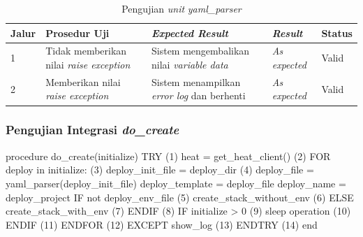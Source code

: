 \begin{longtable}{|P{.06\textwidth}|P{.30\textwidth}|P{.30\textwidth}|P{.10\textwidth}|P{.08\textwidth}|}
  \caption{Pengujian \emph{unit} \emph{yaml\_parser}} \label{jalur:yaml_parser} \\
  \hline
  \textbf{Jalur} & \textbf{Prosedur Uji} & \textbf{\emph{Expected Result}}
  & \textbf{\emph{Result}} & \textbf{Status} \\\hline
  1 & Tidak memberikan nilai \emph{raise exception} & Sistem mengembalikan nilai
                               \emph{variable data} & \emph{As expected} & Valid \\\hline
  2 & Memberikan nilai \emph{raise exception} & Sistem menampilkan \emph{error log} dan
                               berhenti & \emph{As expected} & Valid \\\hline
\end{longtable}


\subsubsection{Pengujian Integrasi \emph{do\_create}}

\begin{code}
\begin{ignasicblock}[title=do\_create,minted language=text]
procedure do_create(initialize)
    TRY                                               (1)
        heat = get_heat_client()                      (2)
        FOR deploy in initialize:                     (3)
            deploy_init_file = deploy_dir             (4)
            deploy_file = yaml_parser(deploy_init_file)
            deploy_template = deploy_file
            deploy_name = deploy_project
            IF not deploy_env_file                    (5)
              create_stack_without_env                (6)
            ELSE
              create_stack_with_env                   (7)
            ENDIF                                     (8)
            IF initialize > 0                         (9)
              sleep operation                         (10)
            ENDIF                                     (11)
        ENDFOR                                        (12)
    EXCEPT
       show_log                                       (13)
    ENDTRY                                            (14)
end
\end{ignasicblock}
\label{pc:create-vm-f}
\end{code}


